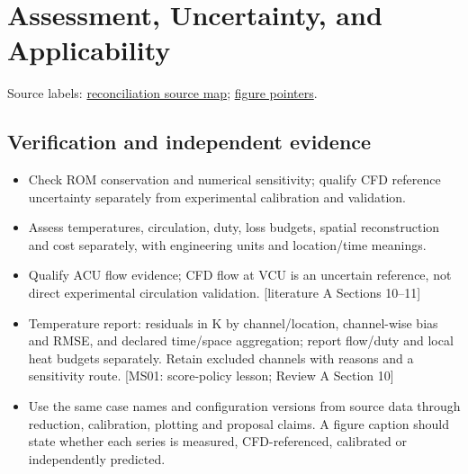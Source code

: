 \section{Assessment, Uncertainty, and Applicability}
\noindent\small Source labels: \href{run:doc_support/reconciliation/2026-11-02/SOURCES.md}{reconciliation source map}; \href{run:doc_support/reconciliation/2026-11-02/FIGURE_POINTERS.md}{figure pointers}.\normalsize

\subsection{Verification and independent evidence}
\begin{itemize}[leftmargin=*]
\item Check ROM conservation and numerical sensitivity; qualify CFD reference uncertainty separately from experimental calibration and validation.
\item Assess temperatures, circulation, duty, loss budgets, spatial reconstruction and cost separately, with engineering units and location/time meanings.
\item Qualify ACU flow evidence; CFD flow at VCU is an uncertain reference, not direct experimental circulation validation. [literature A Sections 10--11]
\item Temperature report: residuals in K by channel/location, channel-wise bias and RMSE, and declared time/space aggregation; report flow/duty and local heat budgets separately. Retain excluded channels with reasons and a sensitivity route. [MS01: score-policy lesson; Review A Section 10]
\item Use the same case names and configuration versions from source data through reduction, calibration, plotting and proposal claims. A figure caption should state whether each series is measured, CFD-referenced, calibrated or independently predicted.
\end{itemize}

